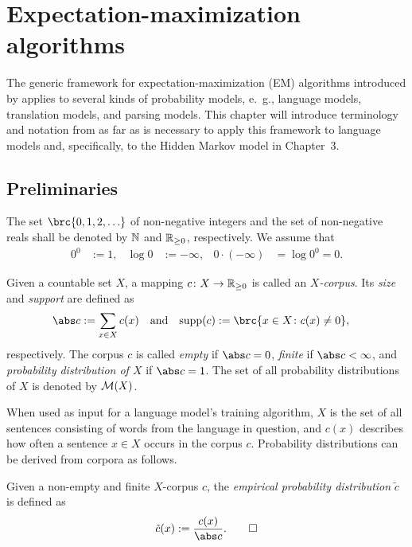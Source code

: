 \chapter{Expectation-maximization algorithms}

The generic framework for expectation-maximization (EM) algorithms introduced
by \cite{bucstuvog15} applies to several kinds of probability models, e.~g.,
language models, translation models, and parsing models.
This chapter will introduce terminology and notation from \cite{bucstuvog15} as
far as is necessary to apply this framework to language models and,
specifically, to the Hidden Markov model in Chapter~3.

\section{Preliminaries}

The set $\brc{0,1,2,\ldots}$ of non-negative integers and the set of
non-negative reals shall be denoted by $\mathbb N$ and $\mathbb R_{\geq0}$, respectively.
We assume that
\begin{align*}
 0^0 &:= 1, &
 \log 0 &:= -\infty, &
 0 \cdot (-\infty) &= \log 0^0 = 0.
\end{align*}

\begin{definition}
 Given a countable set $X$, a mapping $c\colon X \to \mathbb R_{\geq0}$ is called an
 \emph{$X$-corpus}. Its \emph{size} and \emph{support} are defined as
 \begin{align*}
  \abs c &:= \sum_{x\in X} c(x) &
  \text{and} &&
  \operatorname{supp}(c) &:= \brc{x\in X\colon c(x)\neq0},
 \end{align*}
 respectively. The corpus $c$ is called \emph{empty} if $\abs c = 0$, \emph{finite} if
 $\abs c<\infty$, and \emph{probability distribution of $X$} if $\abs c = 1$.
 The set of all probability distributions of $X$ is denoted by $\mathcal M(X)$.
\end{definition}

When used as input for a language model's training algorithm, $X$ is the set of
all sentences consisting of words from the language in question, and $c(x)$
describes how often a sentence $x\in X$ occurs in the corpus $c$.
Probability distributions can be derived from corpora as follows.

\begin{definition}
 Given a non-empty and finite $X$-corpus $c$, the \emph{empirical probability
 distribution} $\tilde c$ is defined as
 \[
  \tilde c(x) := \frac{c(x)}{\abs c}.\qedhere
 \]
\end{definition}

